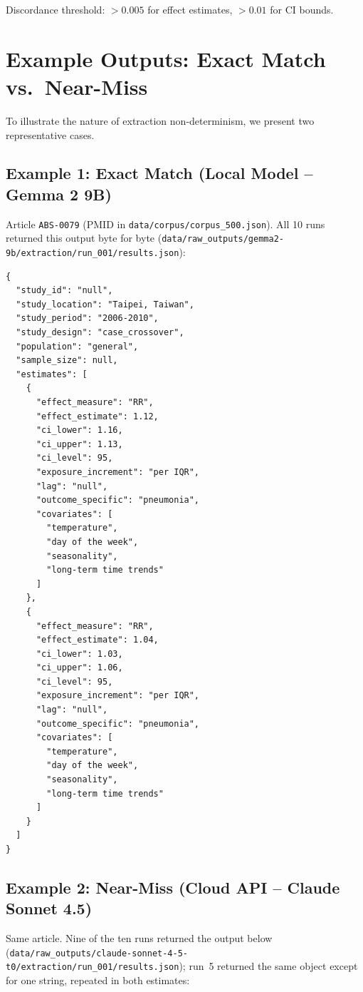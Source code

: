 \documentclass[11pt]{article}
\begin{document}
Discordance threshold: $>0.005$ for effect estimates, $>0.01$ for CI bounds.

\section{Example Outputs: Exact Match vs.\ Near-Miss}
\label{sec:examples}

To illustrate the nature of extraction non-determinism, we present two representative cases.

\subsection{Example 1: Exact Match (Local Model -- Gemma 2 9B)}

Article \texttt{ABS-0079} (PMID in \texttt{data/corpus/corpus\_500.json}). All 10 runs returned this output byte for byte (\texttt{data/raw\_outputs/gemma2-9b/extraction/run\_001/results.json}):

\begin{lstlisting}[language={},caption={Gemma 2 9B extraction output for ABS-0079, identical across all 10 runs}]
{
  "study_id": "null",
  "study_location": "Taipei, Taiwan",
  "study_period": "2006-2010",
  "study_design": "case_crossover",
  "population": "general",
  "sample_size": null,
  "estimates": [
    {
      "effect_measure": "RR",
      "effect_estimate": 1.12,
      "ci_lower": 1.16,
      "ci_upper": 1.13,
      "ci_level": 95,
      "exposure_increment": "per IQR",
      "lag": "null",
      "outcome_specific": "pneumonia",
      "covariates": [
        "temperature",
        "day of the week",
        "seasonality",
        "long-term time trends"
      ]
    },
    {
      "effect_measure": "RR",
      "effect_estimate": 1.04,
      "ci_lower": 1.03,
      "ci_upper": 1.06,
      "ci_level": 95,
      "exposure_increment": "per IQR",
      "lag": "null",
      "outcome_specific": "pneumonia",
      "covariates": [
        "temperature",
        "day of the week",
        "seasonality",
        "long-term time trends"
      ]
    }
  ]
}
\end{lstlisting}

\subsection{Example 2: Near-Miss (Cloud API -- Claude Sonnet 4.5)}

Same article. Nine of the ten runs returned the output below (\texttt{data/raw\_outputs/claude-sonnet-4-5-t0/extraction/run\_001/results.json}); run~5 returned the same object except for one string, repeated in both estimates:
\end{document}
